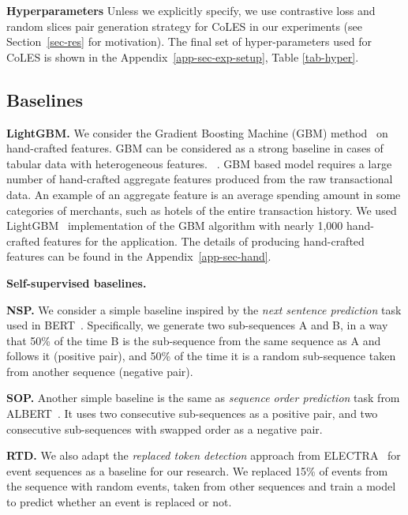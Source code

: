 \documentclass{article}
\begin{document}
\textbf{Hyperparameters} Unless we explicitly specify, we use contrastive loss and random slices pair generation strategy for CoLES in our experiments (see Section~\ref{sec-res} for motivation). The final set of hyper-parameters used for CoLES is shown in the Appendix~\ref{app-sec-exp-setup}, Table \ref{tab-hyper}.

\subsection{Baselines} \label{sec-baselines}


\textbf{LightGBM.} We consider the Gradient Boosting Machine (GBM) method~\citep{Friedman2001GreedyFA} on hand-crafted features. GBM can be considered as a strong baseline in cases of tabular data with heterogeneous features.
~\citep{Wu2009AdaptingBF, Vorobev2019LearningTS, Zhang2015AGB, Niu2019ACS}.
GBM based model requires a large number of hand-crafted aggregate features produced from the raw transactional data. An example of an aggregate feature is an average spending amount in some categories of merchants, such as hotels of the entire transaction history.
We used LightGBM~\citep{Ke2017LightGBMAH} implementation of the GBM algorithm with nearly 1,000 hand-crafted features for the application. The details of producing hand-crafted features can be found in the Appendix~\ref{app-sec-hand}.

\textbf{Self-supervised baselines.} 

\textbf{NSP.} We consider a simple baseline inspired by the \textit{next sentence prediction} task used in BERT~\citep{Devlin2019BERTPO}. Specifically, we generate two sub-sequences A and B, in a way that 50\% of the time B is the sub-sequence from the same sequence as A and follows it (positive pair), and 50\% of the time it is a random sub-sequence taken from another sequence (negative pair).

\textbf{SOP.} Another simple baseline is the same as \textit{sequence order prediction} task from ALBERT~\citep{Lan2020ALBERTAL}. It uses two consecutive sub-sequences as a positive pair, and two consecutive sub-sequences with swapped order as a negative pair.

\textbf{RTD.} We also adapt the \textit{replaced token detection} approach from ELECTRA~\citep{Clark2020ELECTRAPT} for event sequences as a baseline for our research. We replaced 15\% of events from the sequence with random events, taken from other sequences and train a model to predict whether an event is replaced or not.
\end{document}
